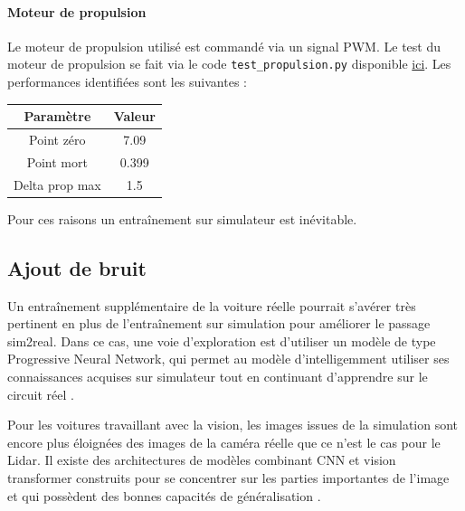 \documentclass[french]{article}
\begin{document}
\paragraph{Moteur de propulsion}

Le moteur de propulsion utilisé est commandé via un signal PWM. 
Le test du moteur de propulsion se fait via le code \verb|test_propulsion.py| disponible \href{https://github.com/basileplus/RCAutonomousCar.git}{ici}. Les performances identifiées sont les suivantes :

\begin{table}[H]
    \centering
    \begin{tabular}{|c|c|}
        \hline
        Paramètre        & Valeur \\
        \hline
        Point zéro       & 7.09  \\
        \hline
        Point mort       & 0.399 \\
        \hline
        Delta prop max   & 1.5   \\
        \hline
    \end{tabular}
\end{table}

\vspace*{0.5cm}

Pour ces raisons un entraînement sur simulateur est inévitable. 


\subsection{Ajout de bruit}
Un entraînement supplémentaire de la voiture réelle pourrait s'avérer très pertinent en plus de l'entraînement sur simulation pour améliorer le passage sim2real. Dans ce cas, une voie d'exploration est d'utiliser un modèle de type Progressive Neural Network, qui permet au modèle d'intelligemment utiliser ses connaissances acquises sur simulateur tout en continuant d'apprendre sur le circuit réel \cite{rusu2022progressive}. 

\vspace{0.5cm}

Pour les voitures travaillant avec la vision, les images issues de la simulation sont encore plus éloignées des images de la caméra réelle que ce n'est le cas pour le Lidar. Il existe des architectures de modèles combinant CNN et vision transformer construits pour se concentrer sur les parties importantes de l'image et qui possèdent des bonnes capacités de généralisation \cite{li2023style}.
\end{document}
